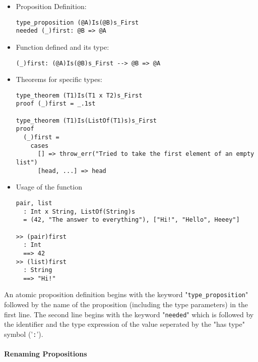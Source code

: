 \documentclass{article}
\begin{document}
\begin{itemize}
\begin{itemize}
\item Proposition Definition:

\begin{verbatim}
type_proposition (@A)Is(@B)s_First
needed (_)first: @B => @A
\end{verbatim}

\item Function defined and its type:

\begin{verbatim}
(_)first: (@A)Is(@B)s_First --> @B => @A
\end{verbatim}

\item Theorems for specific types:

\begin{verbatim}
type_theorem (T1)Is(T1 x T2)s_First
proof (_)first = _.1st

type_theorem (T1)Is(ListOf(T1)s)s_First
proof
  (_)first =
    cases
      [] => throw_err("Tried to take the first element of an empty list")
      [head, ...] => head
\end{verbatim}

\item Usage of the function
\begin{verbatim}
pair, list
  : Int x String, ListOf(String)s
  = (42, "The answer to everything"), ["Hi!", "Hello", Heeey"]

>> (pair)first
  : Int
  ==> 42
>> (list)first
  : String
  ==> "Hi!"
\end{verbatim}
\end{itemize}

An atomic proposition definition begins with the keyword
"\verb|type_proposition|" followed by the name of the proposition (including
the type parameters) in the first line. The second line begins with the keyword
"\verb|needed|" which is followed by the identifier and the
type expression of the value seperated by the "has type" symbol ('\verb|:|').

\end{itemize}

\newpage

\paragraph{Renaming Propositions}
\end{document}
